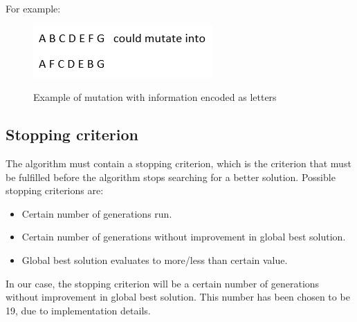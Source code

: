 For example:
\begin{figure}[h]
	\centering
	{\includegraphics[scale=0.5]{Images/mutation_letters.PNG}}\\[0.5cm]
	\caption{Example of mutation with information encoded as letters}
	\label{fig:mutation_letters}
\end{figure}

\subsection{Stopping criterion}
The algorithm must contain a stopping criterion, which is the criterion that must be fulfilled before the algorithm stops searching for a better solution. Possible stopping criterions are:

\begin{itemize}
	\item Certain number of generations run.
	\item Certain number of generations without improvement in global best solution.
	\item Global best solution evaluates to more/less than certain value.
\end{itemize}

In our case, the stopping criterion will be a certain number of generations without improvement in global best solution. This number has been chosen to be 19, due to implementation details.